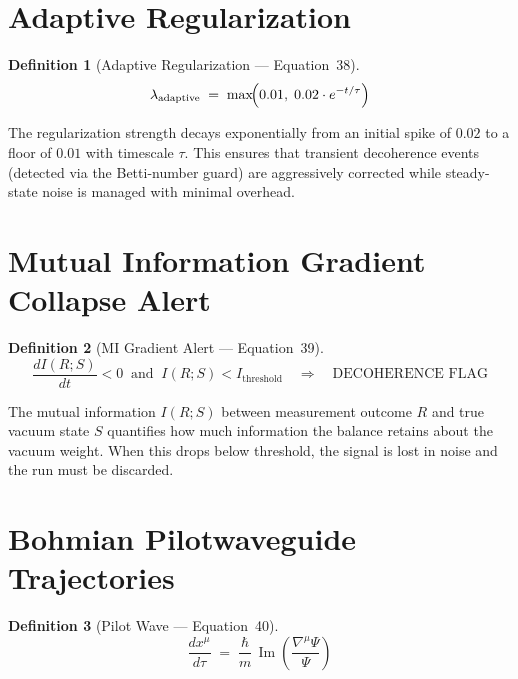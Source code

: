 \documentclass[11pt,a4paper]{article}
\newtheorem{definition}{Definition}[section]
\theoremstyle{remark}
\begin{document}
\section{Adaptive Regularization}
\label{sec:eq38}

\begin{definition}[Adaptive Regularization --- Equation~38]
\begin{equation}\label{eq:adaptive}
    \lambda_{\text{adaptive}} \;=\; \max\!\Bigl(0.01,\; 0.02\cdot e^{-t/\tau}\Bigr)
\end{equation}
\end{definition}

The regularization strength decays exponentially from an initial spike of $0.02$ to a floor of $0.01$ with timescale $\tau$.  This ensures that transient decoherence events (detected via the Betti-number guard) are aggressively corrected while steady-state noise is managed with minimal overhead.

\section{Mutual Information Gradient Collapse Alert}
\label{sec:eq39}

\begin{definition}[MI Gradient Alert --- Equation~39]
\begin{equation}\label{eq:mialert}
    \frac{dI(R;S)}{dt} < 0 \;\;\text{and}\;\; I(R;S) < I_{\text{threshold}}
    \quad\Longrightarrow\quad \text{DECOHERENCE FLAG}
\end{equation}
\end{definition}

The mutual information $I(R;S)$ between measurement outcome $R$ and true vacuum state $S$ quantifies how much information the balance retains about the vacuum weight.  When this drops below threshold, the signal is lost in noise and the run must be discarded.

\section{Bohmian Pilotwaveguide Trajectories}
\label{sec:eq40}

\begin{definition}[Pilot Wave --- Equation~40]
\begin{equation}\label{eq:pilotwave}
    \frac{dx^\mu}{d\tau} \;=\; \frac{\hbar}{m}\,
        \operatorname{Im}\!\left(\frac{\nabla^\mu \Psi}{\Psi}\right)
\end{equation}
\end{definition}
\end{document}
